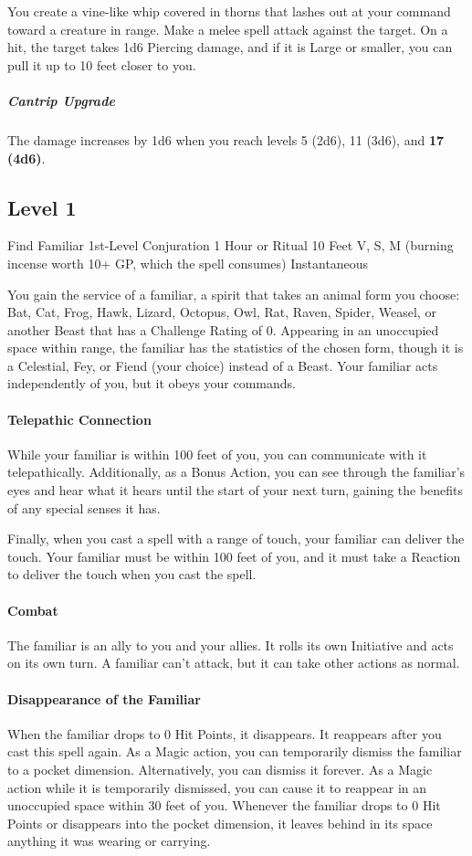 \documentclass[letterpaper,openany,oneside,twocolumn]{book}
\begin{document}
You create a vine-like whip covered in thorns that lashes out at your command toward a creature in range. Make a melee spell attack against the target. On a hit, the target takes 1d6 Piercing damage, and if it is Large or smaller, you can pull it up to 10 feet closer to you.

\subparagraph*{Cantrip Upgrade} The damage increases by 1d6 when you reach levels 5 (2d6), 11 (3d6), and \textbf{17 (4d6)}.

\subsection*{Level 1}
\DndSpellHeader
  {Find Familiar}
  {1st-Level Conjuration}
  {1 Hour or Ritual}
  {10 Feet}
  {V, S, M (burning incense worth 10+ GP, which the spell consumes)}
  {Instantaneous}

You gain the service of a familiar, a spirit that takes an animal form you choose: Bat, Cat, Frog, Hawk, Lizard, Octopus, Owl, Rat, Raven, Spider, Weasel, or another Beast that has a Challenge Rating of 0. Appearing in an unoccupied space within range, the familiar has the statistics of the chosen form, though it is a Celestial, Fey, or Fiend (your choice) instead of a Beast. Your familiar acts independently of you, but it obeys your commands.
\paragraph{Telepathic Connection} While your familiar is within 100 feet of you, you can communicate with it telepathically. Additionally, as a Bonus Action, you can see through the familiar's eyes and hear what it hears until the start of your next turn, gaining the benefits of any special senses it has.

Finally, when you cast a spell with a range of touch, your familiar can deliver the touch. Your familiar must be within 100 feet of you, and it must take a Reaction to deliver the touch when you cast the spell.
\paragraph{Combat} The familiar is an ally to you and your allies. It rolls its own Initiative and acts on its own turn. A familiar can't attack, but it can take other actions as normal.
\paragraph{Disappearance of the Familiar} When the familiar drops to 0 Hit Points, it disappears. It reappears after you cast this spell again. As a Magic action, you can temporarily dismiss the familiar to a pocket dimension. Alternatively, you can dismiss it forever. As a Magic action while it is temporarily dismissed, you can cause it to reappear in an unoccupied space within 30 feet of you. Whenever the familiar drops to 0 Hit Points or disappears into the pocket dimension, it leaves behind in its space anything it was wearing or carrying.
\end{document}
